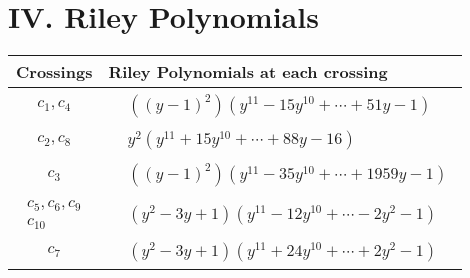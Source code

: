 \documentclass[1p]{elsarticle_modified}
\theoremstyle{definition}
\begin{document}
\centering \section*{ IV. Riley Polynomials}
\begin{tabular}{m{50pt}|m{274pt}}
Crossings & \hspace{64pt}Riley Polynomials at each crossing \\
\hline $$\begin{aligned}c_{1},c_{4}\end{aligned}$$&$\begin{aligned}
&((y-1)^2)(y^{11}-15 y^{10}+\cdots+51 y-1)
\end{aligned}$\\
\hline $$\begin{aligned}c_{2},c_{8}\end{aligned}$$&$\begin{aligned}
&y^2(y^{11}+15 y^{10}+\cdots+88 y-16)
\end{aligned}$\\
\hline $$\begin{aligned}c_{3}\end{aligned}$$&$\begin{aligned}
&((y-1)^2)(y^{11}-35 y^{10}+\cdots+1959 y-1)
\end{aligned}$\\
\hline $$\begin{aligned}c_{5},c_{6},c_{9}\\c_{10}\end{aligned}$$&$\begin{aligned}
&(y^2-3 y+1)(y^{11}-12 y^{10}+\cdots-2 y^2-1)
\end{aligned}$\\
\hline $$\begin{aligned}c_{7}\end{aligned}$$&$\begin{aligned}
&(y^2-3 y+1)(y^{11}+24 y^{10}+\cdots+2 y^2-1)
\end{aligned}$\\
\hline
\end{tabular}
\vskip 2pc
\end{document}
